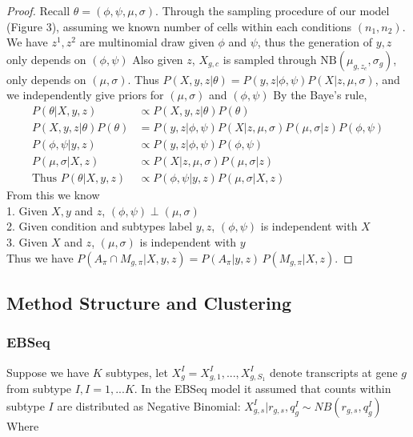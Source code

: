 \documentclass[aoas,preprint]{imsart}
\begin{document}
\begin{proof}
Recall $\theta = (\phi, \psi, \mu, \sigma)$.
Through the sampling procedure of our model (Figure 3), assuming we known number of cells within each conditions $(n_1,n_2)$. We have $z^1, z^2$ are multinomial draw given $\phi$ and $\psi$, 
thus the generation of $y, z$ only depends on $(\phi,\psi)$
Also given $z$, $X_{g,c}$ is sampled through $\text{NB}(\mu_{g,z_c}, \sigma_g)$, only depends on $(\mu, \sigma)$.
Thus $P(X,y,z | \theta) = P(y, z | \phi,\psi ) P(X | z, \mu, \sigma)$, and we independently give priors for $(\mu,\sigma)$ and $(\phi, \psi)$
By the Baye's rule, 
\begin{align*}
P(\theta | X,y,z) &\propto P(X,y,z | \theta) P(\theta) \\
P(X,y,z | \theta) P(\theta)  &=  P(y, z | \phi,\psi ) P(X | z, \mu, \sigma) P(\mu,\sigma | z) P(\phi, \psi)\\
P(\phi,\psi | y, z) &\propto P(y, z | \phi,\psi )P(\phi, \psi)\\
P(\mu, \sigma | X, z) &\propto P(X | z, \mu, \sigma) P(\mu,\sigma | z)\\
\text{Thus }
P(\theta | X,y,z) &\propto P(\phi,\psi | y, z) P(\mu, \sigma | X, z)
\end{align*}
From this we know\\
1. Given $X,y$ and $z$, $(\phi, \psi) \perp (\mu, \sigma)$\\ 
2. Given condition and subtypes label $y,z$, $(\phi,\psi)$ is independent with $X$\\
3. Given $X$ and $z$, $(\mu, \sigma)$ is independent with $y$\\
Thus we have $  P\left(A_\pi \cap M_{g,\pi} |X,y,z \right) 
 =  P\left(A_\pi |y,z \right) \, 
                      P\left(M_{g,\pi}| X,z \right).  $
\end{proof}


\subsection{Method Structure and Clustering}

\subsubsection{EBSeq}

Suppose we have $K$ subtypes, let $X_g^I = X_{g, 1}^I, ... , X_{g, S_1}^I$ denote transcripts at gene $g$ from subtype $I, I = 1, ... K$.  In the EBSeq model it assumed that counts within subtype $I$ are distributed as Negative Binomial:
$X_{g, s}^I | r_{g,s}, q_g^I \sim NB(r_{g,s}, q_g^I)$ Where
\end{document}
